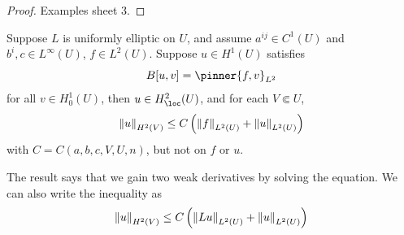\documentclass{article}
\begin{document}
\begin{proof}
    Examples sheet 3.
\end{proof}

\begin{theorem}
      \label{thm:int-regularity} Suppose \(L\) is uniformly elliptic on \(U\), and assume \(a^{ij} \in C^1(U)\) and \(b^i, c \in L^\infty(U)\), \(f \in L^2(U)\). Suppose \(u \in H^1(U)\) satisfies 
    \begin{equation}
        \label{eq:interior-regularity}
        B[u, v] = \pinner{f, v}_{L^2}
    \end{equation}
    for all \(v \in H^1_0(U)\), then \(u \in H^2_\loc(U)\), and for each \(V \Subset U\),
    \[\norm{u}_{H^2(V)} \le C\left(\norm{f}_{L^2(U)} + \norm{u}_{L^2(U)}\right)\]
    with \(C = C(a, b, c, V, U, n)\), but not on \(f\) or \(u\).
\end{theorem}

\begin{remark}
    The result says that we gain two weak derivatives by solving the equation. We can also write the inequality as
    \[\norm{u}_{H^2(V)} \le C\left(\norm{Lu}_{L^2(U)} + \norm{u}_{L^2(U)}\right)\]
\end{remark}
\end{document}
